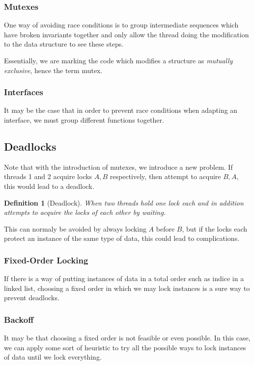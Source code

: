 \documentclass[10pt]{article}
\theoremstyle{break}
\newtheorem{defn}{Definition}[subsection]
\begin{document}
\subsubsection{Mutexes}
One way of avoiding race conditions is to group intermediate sequences which have broken invariants together and only allow the thread doing the modification to the data structure to see these steps.

Essentially, we are marking the code which modifies a structure as \textit{mutually exclusive}, hence the term mutex.

\subsubsection{Interfaces}
It may be the case that in order to prevent race conditions when adapting an interface, we must group different functions together.

\subsection{Deadlocks}
Note that with the introduction of mutexes, we introduce a new problem.
If threads 1 and 2 acquire locks $A, B$ respectively, then attempt to acquire $B, A$, this would lead to a deadlock.

\begin{defn}[Deadlock]
    When two threads hold one lock each and in addition attempts to acquire the locks of each other by waiting.
\end{defn}

This can normaly be avoided by always locking $A$ before $B$, but if the locks each protect an instance of the same type of data, this could lead to complications.

\subsubsection{Fixed-Order Locking}
If there is a way of putting instances of data in a total order such as indice in a linked list, choosing a fixed order in which we may lock instances is a sure way to prevent deadlocks.

\subsubsection{Backoff}
It may be that choosing a fixed order is not feasible or even possible.
In this case, we can apply some sort of heuristic to try all the possible ways to lock instances of data until we lock everything.
\end{document}
